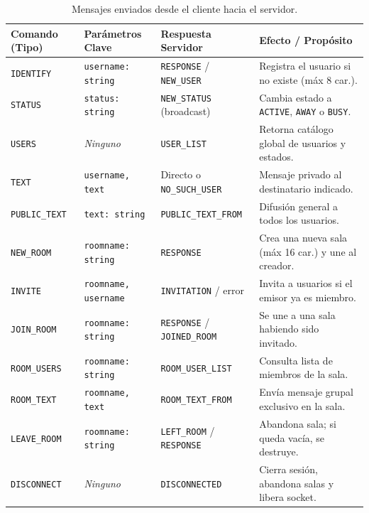 \documentclass[12pt,a4paper]{article}
\begin{document}
\begin{table}[htbp]
\centering
\footnotesize
\renewcommand{\arraystretch}{0.92}
\begin{tabularx}{\textwidth}{l p{4.5cm} p{3.2cm} X}
\toprule
\textbf{Comando (Tipo)} & \textbf{Parámetros Clave} & \textbf{Respuesta Servidor} & \textbf{Efecto / Propósito} \\
\midrule
\texttt{IDENTIFY} & \texttt{username: string} & \texttt{RESPONSE} / \texttt{NEW\_USER} & Registra el usuario si no existe (máx 8 car.). \\
\texttt{STATUS} & \texttt{status: string} & \texttt{NEW\_STATUS} (broadcast) & Cambia estado a \texttt{ACTIVE}, \texttt{AWAY} o \texttt{BUSY}. \\
\texttt{USERS} & \textit{Ninguno} & \texttt{USER\_LIST} & Retorna catálogo global de usuarios y estados. \\
\texttt{TEXT} & \texttt{username, text} & Directo o \texttt{NO\_SUCH\_USER} & Mensaje privado al destinatario indicado. \\
\texttt{PUBLIC\_TEXT} & \texttt{text: string} & \texttt{PUBLIC\_TEXT\_FROM} & Difusión general a todos los usuarios. \\
\texttt{NEW\_ROOM} & \texttt{roomname: string} & \texttt{RESPONSE} & Crea una nueva sala (máx 16 car.) y une al creador. \\
\texttt{INVITE} & \texttt{roomname, username} & \texttt{INVITATION} / error & Invita a usuarios si el emisor ya es miembro. \\
\texttt{JOIN\_ROOM} & \texttt{roomname: string} & \texttt{RESPONSE} / \texttt{JOINED\_ROOM} & Se une a una sala habiendo sido invitado. \\
\texttt{ROOM\_USERS} & \texttt{roomname: string} & \texttt{ROOM\_USER\_LIST} & Consulta lista de miembros de la sala. \\
\texttt{ROOM\_TEXT} & \texttt{roomname, text} & \texttt{ROOM\_TEXT\_FROM} & Envía mensaje grupal exclusivo en la sala. \\
\texttt{LEAVE\_ROOM} & \texttt{roomname: string} & \texttt{LEFT\_ROOM} / \texttt{RESPONSE} & Abandona sala; si queda vacía, se destruye. \\
\texttt{DISCONNECT} & \textit{Ninguno} & \texttt{DISCONNECTED} & Cierra sesión, abandona salas y libera socket. \\
\bottomrule
\end{tabularx}
\caption{Mensajes enviados desde el cliente hacia el servidor.}
\label{tab:proto_req}
\end{table}
\end{document}
